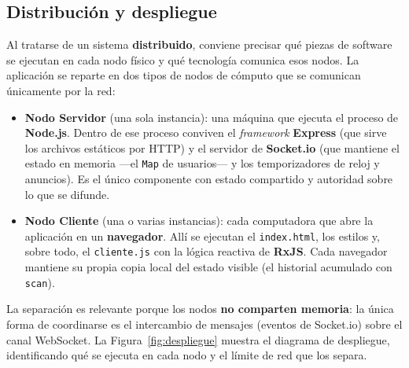 \documentclass[12pt,a4paper]{article}
\begin{document}
\subsection{Distribución y despliegue}
\label{sec:despliegue}

Al tratarse de un sistema \textbf{distribuido}, conviene precisar qué piezas de software se ejecutan en cada nodo físico y qué tecnología comunica esos nodos. La aplicación se reparte en dos tipos de nodos de cómputo que se comunican únicamente por la red:

\begin{itemize}[leftmargin=1.4em]
    \item \textbf{Nodo Servidor} (una sola instancia): una máquina que ejecuta el proceso de \textbf{Node.js}. Dentro de ese proceso conviven el \textit{framework} \textbf{Express} (que sirve los archivos estáticos por HTTP) y el servidor de \textbf{Socket.io} (que mantiene el estado en memoria —el \texttt{Map} de usuarios— y los temporizadores de reloj y anuncios). Es el único componente con estado compartido y autoridad sobre lo que se difunde.
    \item \textbf{Nodo Cliente} (una o varias instancias): cada computadora que abre la aplicación en un \textbf{navegador}. Allí se ejecutan el \texttt{index.html}, los estilos y, sobre todo, el \texttt{cliente.js} con la lógica reactiva de \textbf{RxJS}. Cada navegador mantiene su propia copia local del estado visible (el historial acumulado con \texttt{scan}).
\end{itemize}

La separación es relevante porque los nodos \textbf{no comparten memoria}: la única forma de coordinarse es el intercambio de mensajes (eventos de Socket.io) sobre el canal WebSocket. La Figura~\ref{fig:despliegue} muestra el diagrama de despliegue, identificando qué se ejecuta en cada nodo y el límite de red que los separa.
\end{document}
